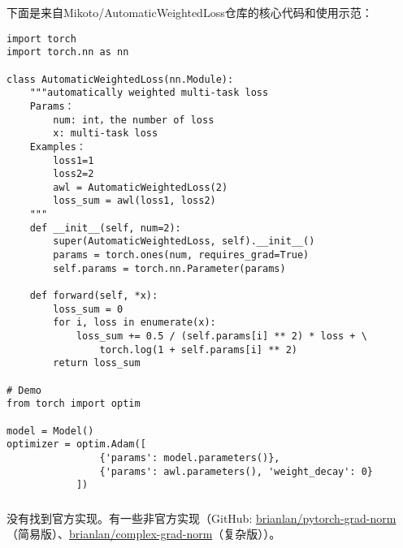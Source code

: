 \documentclass{ctexart}
\begin{document}
下面是来自Mikoto/Automatic\-Weighted\-Loss仓库的核心代码和使用示范：
\begin{verbatim}
import torch
import torch.nn as nn

class AutomaticWeightedLoss(nn.Module):
    """automatically weighted multi-task loss
    Params：
        num: int，the number of loss
        x: multi-task loss
    Examples：
        loss1=1
        loss2=2
        awl = AutomaticWeightedLoss(2)
        loss_sum = awl(loss1, loss2)
    """
    def __init__(self, num=2):
        super(AutomaticWeightedLoss, self).__init__()
        params = torch.ones(num, requires_grad=True)
        self.params = torch.nn.Parameter(params)

    def forward(self, *x):
        loss_sum = 0
        for i, loss in enumerate(x):
            loss_sum += 0.5 / (self.params[i] ** 2) * loss + \
                torch.log(1 + self.params[i] ** 2)
        return loss_sum

# Demo
from torch import optim

model = Model()
optimizer = optim.Adam([
                {'params': model.parameters()},
                {'params': awl.parameters(), 'weight_decay': 0}
            ])
\end{verbatim}

\subsubsection{}

没有找到官方实现。有一些非官方实现（GitHub: \href{https://github.com/brianlan/pytorch-grad-norm}{brianlan/pytorch-grad-norm}（简易版）、\href{https://github.com/brianlan/complex-grad-norm}{brianlan/complex-grad-norm}（复杂版））。
\end{document}
